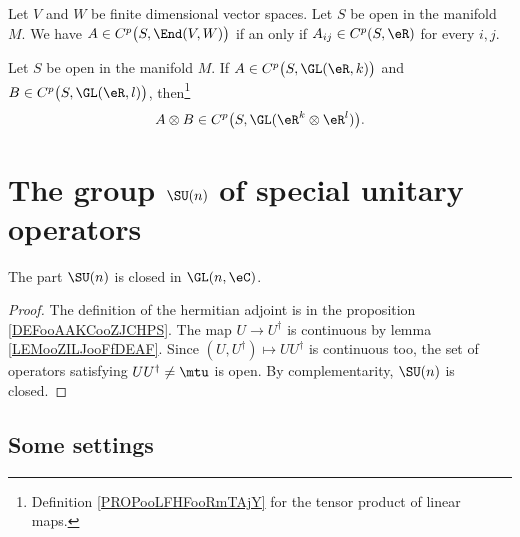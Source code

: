 \begin{proposition}		\label{PROPooRRNXooXJZYSB}
	Let \( V\) and \( W\) be finite dimensional vector spaces. Let \( S\) be open in the manifold \( M\). We have \( A\in C^p\big( S,\End(V,W) \big) \) if an only if \( A_{ij}\in C^p(S,\eR)\) for every \( i,j\).
\end{proposition}
\noproof

\begin{proposition}		\label{PROPooLANVooKPiLuu}
	Let \( S\) be open in the manifold \( M\). If \( A\in C^{p}\big( S,\GL(\eR,k) \big)\) and \( B\in C^{p}\big( S,\GL(\eR,l) \big)\), then\footnote{Definition \ref{PROPooLFHFooRmTAjY} for the tensor product of linear maps.}
	\begin{equation}
		A\otimes B\in C^{p}\big( S,\GL(\eR^k\otimes \eR^l) \big).
	\end{equation}
\end{proposition}
\noproof

\section{The group \texorpdfstring{$ \SU(n)$}{SUn} of special unitary operators}

\begin{lemma}        \label{LEMooKFQOooBVtyoW}
	The part \( \SU(n)\) is closed in \( \GL(n,\eC)\).
\end{lemma}

\begin{proof}
	The definition of the hermitian adjoint is in the proposition \ref{DEFooAAKCooZJCHPS}. The map \( U\to U^{\dag}\) is continuous by lemma \ref{LEMooZILJooFfDEAF}. Since \( (U,U^{\dag})\mapsto UU^{\dag}\) is continuous too, the set of operators satisfying \( UU^{\dag}\neq\mtu\) is open. By complementarity, \( \SU(n)\) is closed.
\end{proof}

\subsection{Some settings}

